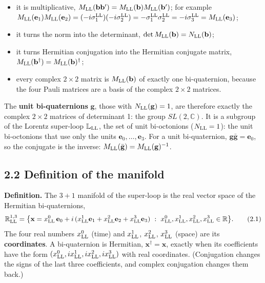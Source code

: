 \documentclass[
  10pt,
]{article}
\providecommand{\tightlist}{%
  \setlength{\itemsep}{0pt}\setlength{\parskip}{0pt}}
\begin{document}
\begin{itemize}
\tightlist
\item
  it is multiplicative,
  \(M_{\rm LL}(\mathbf b\mathbf b')=M_{\rm LL}(\mathbf b)M_{\rm LL}(\mathbf b')\);
  for example
  \(M_{\rm LL}(\mathbf e_1)M_{\rm LL}(\mathbf e_2)=(-i\sigma^{\rm LL}_1)(-i\sigma^{\rm LL}_2)=-\sigma^{\rm LL}_1\sigma^{\rm LL}_2=-i\sigma^{\rm LL}_3=M_{\rm LL}(\mathbf e_3)\);
\item
  it turns the norm into the determinant,
  \(\det M_{\rm LL}(\mathbf b)=N_{\rm LL}(\mathbf b)\);
\item
  it turns Hermitian conjugation into the Hermitian conjugate matrix,
  \(M_{\rm LL}(\mathbf b^\dagger)=M_{\rm LL}(\mathbf b)^\dagger\);
\item
  every complex \(2\times2\) matrix is \(M_{\rm LL}(\mathbf b)\) of
  exactly one bi-quaternion, because the four Pauli matrices are a basis
  of the complex \(2\times2\) matrices.
\end{itemize}

The \textbf{unit bi-quaternions} \(\mathbf g\), those with
\(N_{\rm LL}(\mathbf g)=1\), are therefore exactly the complex
\(2\times2\) matrices of determinant 1: the group \(SL(2,\mathbb C)\).
It is a subgroup of the Lorentz super-loop \(\mathbb L_{\rm LL}\), the
set of unit bi-octonions (\(N_{\rm LL}=1\)): the unit bi-octonions that
use only the units \(\mathbf e_0,\dots,\mathbf e_3\). For a unit
bi-quaternion, \(\mathbf g\bar{\mathbf g}=\mathbf e_0\), so the
conjugate is the inverse:
\(M_{\rm LL}(\bar{\mathbf g})=M_{\rm LL}(\mathbf g)^{-1}\).

\hypertarget{definition-of-the-manifold}{%
\subsection{2.2 Definition of the
manifold}\label{definition-of-the-manifold}}

\textbf{Definition.} The \(3+1\) manifold of the super-loop is the real
vector space of the Hermitian bi-quaternions,
\[\mathbb R^{1,3}_{\rm LL}=\big\{\mathbf x=x^0_{\rm LL}\,\mathbf e_0+i\,(x^1_{\rm LL}\mathbf e_1+x^2_{\rm LL}\mathbf e_2+x^3_{\rm LL}\mathbf e_3)\ :\ x^0_{\rm LL},x^1_{\rm LL},x^2_{\rm LL},x^3_{\rm LL}\in\mathbb R\big\}. \tag{2.1}\]
The four real numbers \(x^0_{\rm LL}\) (time) and \(x^1_{\rm LL}\),
\(x^2_{\rm LL}\), \(x^3_{\rm LL}\) (space) are its \textbf{coordinates}.
A bi-quaternion is Hermitian, \(\mathbf x^\dagger=\mathbf x\), exactly
when its coefficients have the form
\((x^0_{\rm LL},ix^1_{\rm LL},ix^2_{\rm LL},ix^3_{\rm LL})\) with real
coordinates. (Conjugation changes the signs of the last three
coefficients, and complex conjugation changes them back.)
\end{document}
